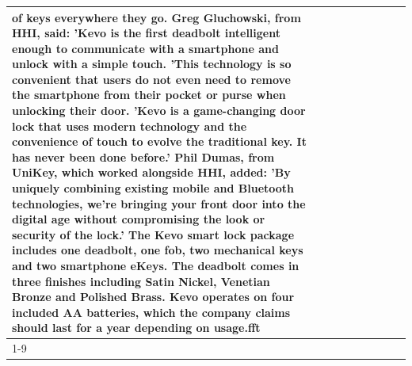 \begin{table}[H]
\begin{tabular}{lllrlllll}
of keys everywhere they go. Greg Gluchowski, from HHI, said: 'Kevo is the first deadbolt intelligent enough to communicate with a smartphone and unlock with a simple touch. 'This technology is so convenient that users do not even need to remove the smartphone from their pocket or purse when unlocking their door. 'Kevo is a game-changing door lock that uses modern technology and the convenience of touch to evolve the traditional key. It has never been done before.' Phil Dumas, from UniKey, which worked alongside HHI, added: 'By uniquely combining existing mobile and Bluetooth technologies, we’re bringing your front door into the digital age without compromising the look or security of the lock.' The Kevo smart lock package includes one deadbolt, one fob, two mechanical keys and two smartphone eKeys. The deadbolt comes in three finishes including Satin Nickel, Venetian Bronze and Polished Brass. Kevo operates on four included AA batteries, which the company claims should last for a year depending on usage.fft \\
\cline{1-9}

\end{tabular}
\end{table}
